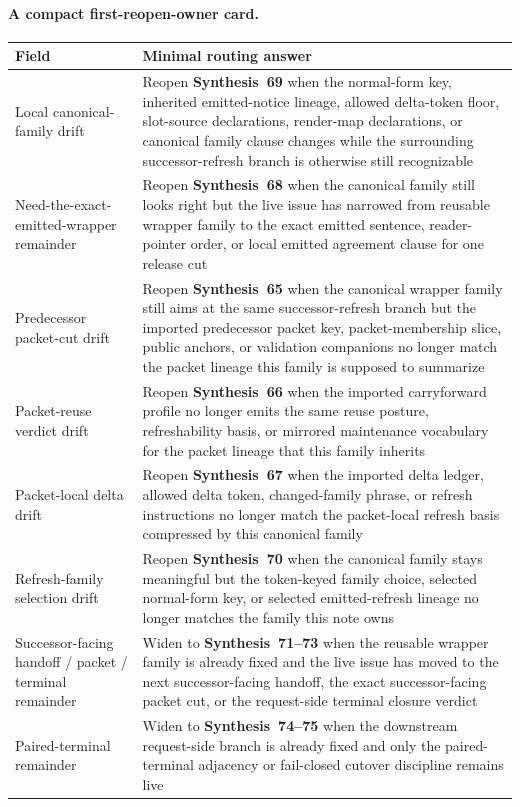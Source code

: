 \documentclass[11pt]{article}
\begin{document}
\paragraph{A compact first-reopen-owner card.}
\begin{center}
\small
\begin{tabularx}{\linewidth}{@{}lX@{}}
\toprule
Field & Minimal routing answer \\
\midrule
Local canonical-family drift & Reopen \textbf{Synthesis~69} when the normal-form key, inherited emitted-notice lineage, allowed delta-token floor, slot-source declarations, render-map declarations, or canonical family clause changes while the surrounding successor-refresh branch is otherwise still recognizable \\
Need-the-exact-emitted-wrapper remainder & Reopen \textbf{Synthesis~68} when the canonical family still looks right but the live issue has narrowed from reusable wrapper family to the exact emitted sentence, reader-pointer order, or local emitted agreement clause for one release cut \\
Predecessor packet-cut drift & Reopen \textbf{Synthesis~65} when the canonical wrapper family still aims at the same successor-refresh branch but the imported predecessor packet key, packet-membership slice, public anchors, or validation companions no longer match the packet lineage this family is supposed to summarize \\
Packet-reuse verdict drift & Reopen \textbf{Synthesis~66} when the imported carryforward profile no longer emits the same reuse posture, refreshability basis, or mirrored maintenance vocabulary for the packet lineage that this family inherits \\
Packet-local delta drift & Reopen \textbf{Synthesis~67} when the imported delta ledger, allowed delta token, changed-family phrase, or refresh instructions no longer match the packet-local refresh basis compressed by this canonical family \\
Refresh-family selection drift & Reopen \textbf{Synthesis~70} when the canonical family stays meaningful but the token-keyed family choice, selected normal-form key, or selected emitted-refresh lineage no longer matches the family this note owns \\
Successor-facing handoff / packet / terminal remainder & Widen to \textbf{Synthesis~71--73} when the reusable wrapper family is already fixed and the live issue has moved to the next successor-facing handoff, the exact successor-facing packet cut, or the request-side terminal closure verdict \\
Paired-terminal remainder & Widen to \textbf{Synthesis~74--75} when the downstream request-side branch is already fixed and only the paired-terminal adjacency or fail-closed cutover discipline remains live \\
\bottomrule
\end{tabularx}
\end{center}
\end{document}
